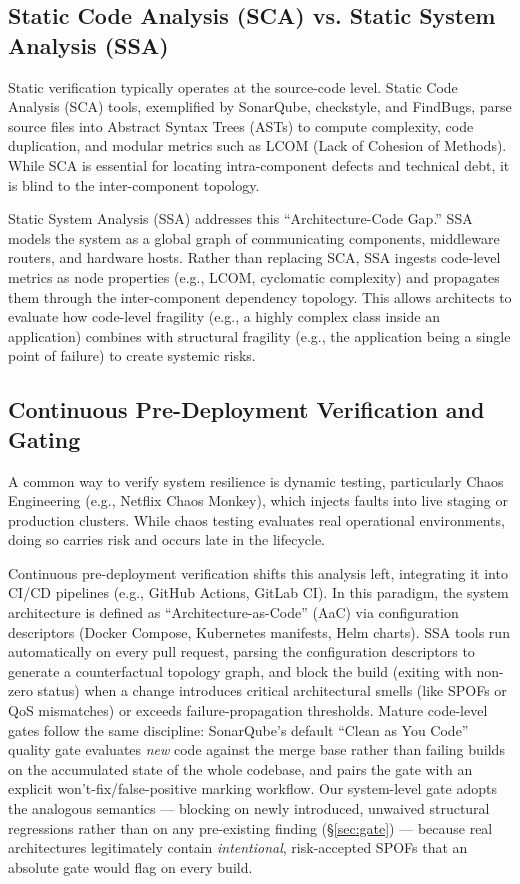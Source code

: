 \documentclass[review]{elsarticle}
\begin{document}
\subsection{Static Code Analysis (SCA) vs. Static System Analysis (SSA)}

Static verification typically operates at the source-code level. Static Code Analysis (SCA) tools,
exemplified by SonarQube, checkstyle, and FindBugs, parse source files into Abstract Syntax Trees
(ASTs) to compute complexity, code duplication, and modular metrics such as LCOM (Lack of Cohesion
of Methods). While SCA is essential for locating intra-component defects and technical debt, it is
blind to the inter-component topology.

Static System Analysis (SSA) addresses this ``Architecture-Code Gap.'' SSA models the system as a
global graph of communicating components, middleware routers, and hardware hosts. Rather than
replacing SCA, SSA ingests code-level metrics as node properties (e.g., LCOM, cyclomatic complexity)
and propagates them through the inter-component dependency topology. This allows architects to
evaluate how code-level fragility (e.g., a highly complex class inside an application) combines with
structural fragility (e.g., the application being a single point of failure) to create systemic
risks.

\subsection{Continuous Pre-Deployment Verification and Gating}

A common way to verify system resilience is dynamic testing, particularly Chaos Engineering (e.g.,
Netflix Chaos Monkey), which injects faults into live staging or production clusters. While chaos
testing evaluates real operational environments, doing so carries risk and occurs late in the
lifecycle.

Continuous pre-deployment verification shifts this analysis left, integrating it into CI/CD
pipelines (e.g., GitHub Actions, GitLab CI). In this paradigm, the system architecture is defined as
``Architecture-as-Code'' (AaC) via configuration descriptors (Docker Compose, Kubernetes manifests,
Helm charts). SSA tools run automatically on every pull request, parsing the configuration
descriptors to generate a counterfactual topology graph, and block the build (exiting with non-zero
status) when a change introduces critical architectural smells (like SPOFs or QoS mismatches) or
exceeds failure-propagation thresholds. Mature code-level gates follow the same discipline:
SonarQube's default ``Clean as You Code'' quality gate evaluates \emph{new} code against the merge
base rather than failing builds on the accumulated state of the whole codebase, and pairs the gate
with an explicit won't-fix/false-positive marking workflow. Our system-level gate adopts the
analogous semantics --- blocking on newly introduced, unwaived structural regressions rather than on
any pre-existing finding (\S\ref{sec:gate}) --- because real architectures legitimately contain
\emph{intentional}, risk-accepted SPOFs that an absolute gate would flag on every build.
\end{document}
